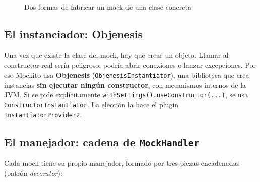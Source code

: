 \documentclass[11pt,a4paper,oneside]{report}
\newcommand{\code}[1]{\texttt{#1}}
\begin{document}
\begin{figure}[H]
\centering
{}
\caption{Dos formas de fabricar un mock de una clase concreta}
\end{figure}

\subsection{El instanciador: Objenesis}
Una vez que existe la clase del mock, hay que crear un objeto. Llamar al constructor real sería peligroso: podría abrir conexiones o lanzar excepciones. Por eso Mockito usa \textbf{Objenesis} (\code{ObjenesisInstantiator}), una biblioteca que crea instancias \textbf{sin ejecutar ningún constructor}, con mecanismos internos de la JVM. Si se pide explícitamente \code{withSettings().useConstructor(...)}, se usa \code{ConstructorInstantiator}. La elección la hace el plugin \code{InstantiatorProvider2}.

\subsection{El manejador: cadena de \code{MockHandler}}
Cada mock tiene su propio manejador, formado por tres piezas encadenadas (patrón \emph{decorator}):
\end{document}
